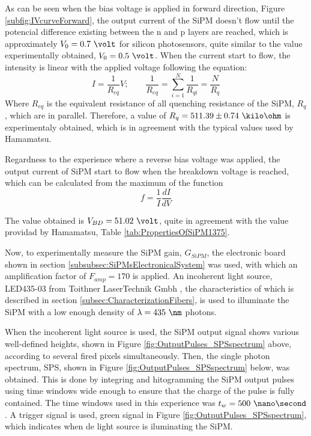 As can be seen when the bias voltage is applied in forward direction, Figure \ref{subfig:IVcurveForward}, the output current of the SiPM doesn't flow until the potencial difference existing between the n and p layers are reached, which is approximately $V_0=0.7~\volt$ for silicon photosensors, quite similar to the value experimentally obtained, $V_0= 0.5~\volt$. When the current start to flow, the intensity is linear with the applied voltage following the equation:
\begin{equation}
I=\frac{1}{R_{eq}}V;  \qquad \frac{1}{R_{eq}} = \sum_{i=1}^{N}\frac{1}{R_{qi}}= \frac{N}{R_{q}}
\label{QuenchingResistance}
\end{equation}
Where $R_{eq}$ is the equivalent resistance of all quenching resistance of the SiPM, $R_{q}$, which are in parallel. Therefore, a value of $R_{q}= 511.39 \pm 0.74~\kilo\ohm$ is experimentaly obtained, which is in agreement with the typical values used by Hamamatsu.

Regardness to the experience where a reverse bias voltage was applied, the output current of SiPM start to flow when the breakdown voltage is reached, which can be calculated from the maximum of the function 
\begin{equation}
f=\frac{1}{I}\frac{dI}{dV}
\label{BreakDownVoltageFunction}
\end{equation}

The value obtained is $V_{BD}=51.02~\volt$, quite in agreement with the value providad by Hamamatsu, Table \ref{tab:PropertiesOfSiPM1375}.

Now, to experimentally measure the SiPM gain, $G_{SiPM}$, the electronic board shown in section \ref{subsubsec:SiPMsElectronicalSystem} was used, with which an amplification factor of $F_{amp}=170$ is applied. An incoherent light source, LED435-03 from Toithner LaserTechnik Gmbh \cite{LEDRLT}, the characteristics of which is described in section \ref{subsec:CharacterizationFibers}, is used to illuminate the SiPM with a low enough density of $\lambda= 435~\nm$ photons.

When the incoherent light source is used, the SiPM output signal shows various well-defined heights, shown in Figure \ref{fig:OutputPulses_SPSspectrum} above, according to several fired pixels simultaneously. Then, the single photon spectrum, SPS, shown in Figure \ref{fig:OutputPulses_SPSspectrum} below, was obtained. This is done by integring and hitogramming the SiPM output pulses using time windows wide enough to ensure that the charge of the pulse is fully contained. The time windows used in this experience was $t_w= 500~\nano\second$. A trigger signal is used, green signal in Figure \ref{fig:OutputPulses_SPSspectrum}, which indicates when de light source is iluminating the SiPM.

